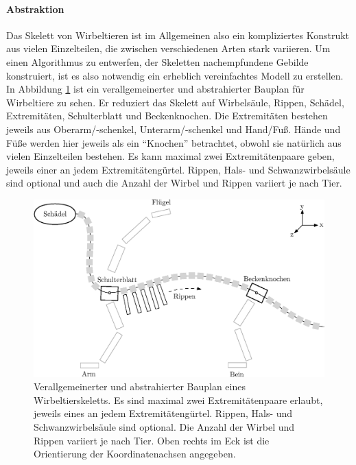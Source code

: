 \paragraph{Abstraktion}
Das Skelett von Wirbeltieren ist im Allgemeinen also ein kompliziertes Konstrukt aus vielen Einzelteilen, die zwischen verschiedenen Arten stark variieren. Um einen Algorithmus zu entwerfen, der Skeletten nachempfundene Gebilde konstruiert, ist es also notwendig ein erheblich vereinfachtes Modell zu erstellen.\\ 
In Abbildung \ref{bauplan_skelett} ist ein verallgemeinerter und abstrahierter Bauplan für Wirbeltiere zu sehen. Er reduziert das Skelett auf Wirbelsäule, Rippen, Schädel, Extremitäten, Schulterblatt und Beckenknochen. Die Extremitäten bestehen jeweils aus Oberarm/-schenkel, Unterarm/-schenkel und Hand/Fuß. Hände und Füße werden hier jeweils als ein "`Knochen"' betrachtet, obwohl sie natürlich aus vielen Einzelteilen bestehen. Es kann maximal zwei Extremitätenpaare geben, jeweils einer an jedem Extremitätengürtel. Rippen, Hals- und Schwanzwirbelsäule sind optional und auch die Anzahl der Wirbel und Rippen variiert je nach Tier.

\begin{figure}
 \centering
 \includegraphics[width=\textwidth]{graphics/skeletonPlan}
 \caption{Verallgemeinerter und abstrahierter Bauplan eines Wirbeltierskeletts. Es sind maximal zwei Extremitätenpaare erlaubt, jeweils eines an jedem Extremitätengürtel. Rippen, Hals- und Schwanzwirbelsäule sind optional. Die Anzahl der Wirbel und Rippen variiert je nach Tier. Oben rechts im Eck ist die Orientierung der Koordinatenachsen angegeben.}
 \label{bauplan_skelett}
\end{figure}


